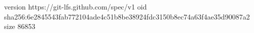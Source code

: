 version https://git-lfs.github.com/spec/v1
oid sha256:6e2845543fab772104ade4c51b8be38924fdc3150b8ec74a63f4ae35d90087a2
size 86853
